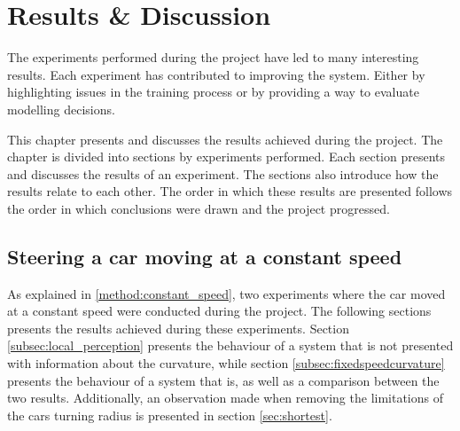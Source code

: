

\chapter{Results \& Discussion}
The experiments performed during the project have led to many interesting results. Each experiment has contributed to improving the system. Either by highlighting issues in the training process or by providing a way to evaluate modelling decisions. 

This chapter presents and discusses the results achieved during the project. The chapter is divided into sections by experiments performed. Each section presents and discusses the results of an experiment. The sections also introduce how the results relate to each other. The order in which these results are presented follows the order in which conclusions were drawn and the project progressed.

\section{Steering a car moving at a constant speed}

As explained in \ref{method:constant_speed}, two experiments where the car moved at a constant speed were conducted during the project. The following sections presents the results achieved during these experiments. Section \ref{subsec:local_perception} presents the behaviour of a system that is not presented with information about the curvature, while section \ref{subsec:fixedspeedcurvature} presents the behaviour of a system that is, as well as a comparison between the two results. Additionally, an observation made when removing the limitations of the cars turning radius is presented in section \ref{sec:shortest}. 

